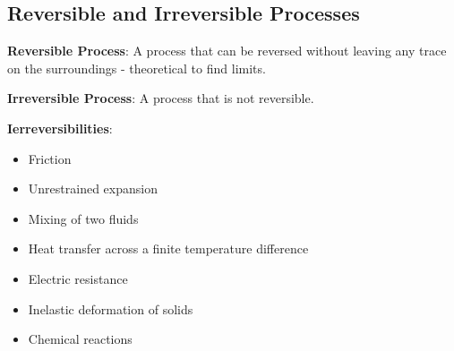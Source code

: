 \documentclass{article}
\begin{document}
\begin{multicols*}{3}
    \subsection*{Reversible and Irreversible Processes}
    \textbf{Reversible Process}: A process that can be reversed without leaving any trace on the surroundings - theoretical to find limits.\par 
    \textbf{Irreversible Process}: A process that is not reversible.\par 
    \textbf{Ierreversibilities}:
    \begin{itemize}
        \item Friction
        \item Unrestrained expansion
        \item Mixing of two fluids
        \item Heat transfer across a finite temperature difference
        \item Electric resistance
        \item Inelastic deformation of solids
        \item Chemical reactions
    \end{itemize}

\end{multicols*}
\end{document}
